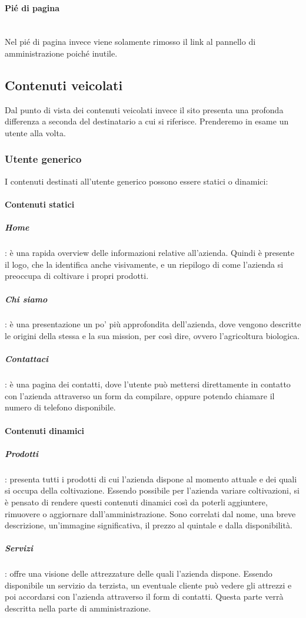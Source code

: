 \paragraph{Pié di pagina}
~\\Nel pié di pagina invece viene solamente rimosso il link al pannello di amministrazione poiché inutile.

\subsection{Contenuti veicolati}
Dal punto di vista dei contenuti veicolati invece il sito presenta una profonda differenza a seconda del destinatario a cui si riferisce. Prenderemo in esame un utente alla volta.
\subsubsection{Utente generico}
I contenuti destinati all'utente generico possono essere statici o dinamici:
\paragraph{Contenuti statici}
\subparagraph{Home}: è una rapida overview delle informazioni relative all'azienda. Quindi è presente il logo, che la identifica anche visivamente, e un riepilogo di come l'azienda si preoccupa di coltivare i propri prodotti.
\subparagraph{Chi siamo}: è una presentazione un po' più approfondita dell'azienda, dove vengono descritte le origini della stessa e la sua mission, per così dire, ovvero l'agricoltura biologica.
\subparagraph{Contattaci}: è una pagina dei contatti, dove l'utente può mettersi direttamente in contatto con l'azienda attraverso un form da compilare, oppure potendo chiamare il numero di telefono disponibile.
\paragraph{Contenuti dinamici}
\subparagraph{Prodotti}: presenta tutti i prodotti di cui l'azienda dispone al momento attuale e dei quali si occupa della coltivazione. Essendo possibile per l'azienda variare coltivazioni, si è pensato di rendere questi contenuti dinamici così da poterli aggiuntere, rimuovere o aggiornare dall'amministrazione. Sono correlati dal nome, una breve descrizione, un'immagine significativa, il prezzo al quintale e dalla disponibilità.
\subparagraph{Servizi}: offre una visione delle attrezzature delle quali l'azienda dispone. Essendo disponibile un servizio da terzista, un eventuale cliente può vedere gli attrezzi e poi accordarsi con l'azienda attraverso il form di contatti. Questa parte verrà descritta nella parte di amministrazione.

